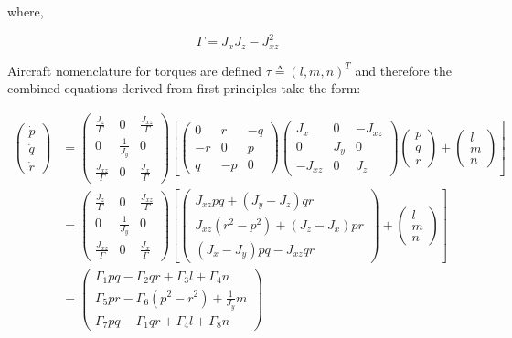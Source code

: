 where,

\begin{equation}
\Gamma = J_xJ_z-J_{xz}^2
\end{equation}

Aircraft nomenclature for torques are defined $\tau\triangleq(l,m,n)^T$ and therefore the combined equations derived from first principles take the form:

\begin{equation}\label{eq:body_rate_derivation}
\begin{split}
	\begin{pmatrix}
		\dot{p} \\
		\dot{q} \\
		\dot{r} 
	\end{pmatrix}
	&=
	\begin{pmatrix}
	\frac{J_z}{\Gamma} & 0 & \frac{J_{xz}}{\Gamma}\\
	0 & \frac{1}{J_y} & 0\\
	\frac{J_{xz}}{\Gamma} & 0 & \frac{J_x}{\Gamma}
	\end{pmatrix}
	\left[
	\begin{pmatrix}
		0& r& -q \\
		-r& 0& p \\
		q& -p& 0
	\end{pmatrix}
	\begin{pmatrix}
	J_x & 0 & -J_{xz}\\
	0 & J_y & 0\\
	-J_{xz} & 0 & J_z
	\end{pmatrix}
	\begin{pmatrix}
		p\\
		q\\
		r
	\end{pmatrix} +
	\begin{pmatrix}
		l\\
		m\\
		n
	\end{pmatrix}
	\right] \\	
	&=
	\begin{pmatrix}
		\frac{J_z}{\Gamma} & 0 & \frac{J_{xz}}{\Gamma}\\
		0 & \frac{1}{J_y} & 0\\
		\frac{J_{xz}}{\Gamma} & 0 & \frac{J_x}{\Gamma}
	\end{pmatrix}
	\left[
	\begin{pmatrix}
	J_{xz}pq+(J_y-J_z)qr\\
	J_{xz}(r^2-p^2)+(J_z-J_x)pr\\
	(J_x-J_y)pq-J_{xz}qr
	\end{pmatrix}+
	\begin{pmatrix}
		l\\
		m\\
		n
	\end{pmatrix}
	\right]\\	
	&=
	\begin{pmatrix}
		\Gamma_1pq-\Gamma_2qr+\Gamma_3l+\Gamma_4n\\
		\Gamma_5pr-\Gamma_6(p^2-r^2)+\frac{1}{J_y}m\\
		\Gamma_7pq-\Gamma_1qr+\Gamma_4l+\Gamma_8n
	\end{pmatrix}
	\end{split}		
\end{equation}
